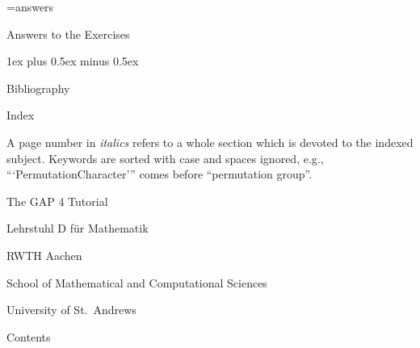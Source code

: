 
\immediate\openout\ans=answers

\FrontMatter
%

\Chapters
{}

\Appendices

\Chapter Answers to the Exercises

\parskip 1ex plus 0.5ex minus 0.5ex
\immediate\closeout\ans


\Chapter Bibliography

\Bibliography

\Chapter Index

A  page number in  {\it italics}  refers  to a  whole section which is
devoted to   the indexed subject.  Keywords are  sorted  with case and
spaces ignored,    e.g.,     ```PermutationCharacter'''  comes  before
``permutation group''.

\Index

\undoquotes
\null\vfill
\centerline{\titlefont The GAP 4 Tutorial}
\bigskip
\centerline{\secfont Lehrstuhl D f\"ur Mathematik}
\smallskip
\centerline{\secfont RWTH Aachen}
\bigskip
\centerline{\secfont School of Mathematical and Computational
Sciences}
\smallskip
\centerline{\secfont University of St.~Andrews}

\Chapter Contents
  
\TableOfContents

\bye
